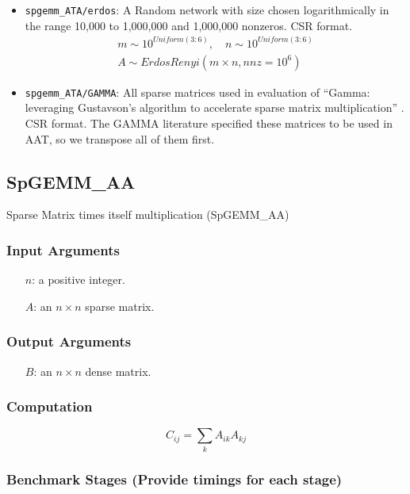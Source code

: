 \documentclass{article}
\begin{document}
\begin{itemize}
	\item \texttt{spgemm\_ATA/erdos}: A Random network with size chosen logarithmically in the range 10,000 to 1,000,000 and 1,000,000 nonzeros. CSR format.
	\begin{multline*}
		m \sim 10^{Uniform(3:6)}, \quad n \sim 10^{Uniform(3:6)} \\
			A \sim ErdosRenyi\left(m\times n, nnz=10^6\right)
	\end{multline*}
	\item \texttt{spgemm\_ATA/GAMMA}: All sparse matrices used in evaluation of
	``Gamma: leveraging Gustavson’s algorithm to accelerate sparse matrix
	multiplication'' \cite{zhang_gamma_2021}. CSR format. The GAMMA literature
	specified these matrices to be used in AAT, so we transpose all of them
	first.
\end{itemize}


\subsection{SpGEMM\_AA}
Sparse Matrix times itself multiplication (SpGEMM\_AA)
\subsubsection{Input Arguments}

\begin{itemize}
	\item[$n$:] a positive integer.
	\item[$A$:] an $n \times n$ sparse matrix.
\end{itemize}

\subsubsection{Output Arguments}

\begin{itemize}
	\item[$B$:] an $n \times n$ dense matrix.
\end{itemize}

\subsubsection{Computation}

$$C_{ij} = \sum_{k}A_{ik}A_{kj}$$

\subsubsection{Benchmark Stages (Provide timings for each stage)}
\end{document}
